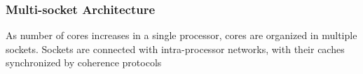 \documentclass[]{beamer}
\begin{document}
\begin{frame}
  \frametitle{Multi-socket Architecture}
  As number of cores increases in a single processor, cores are organized in multiple sockets.
  Sockets are connected with intra-processor networks, with their caches synchronized by coherence protocols
  \begin{figure}
    \centering
  \end{figure}
\end{frame}
\end{document}

